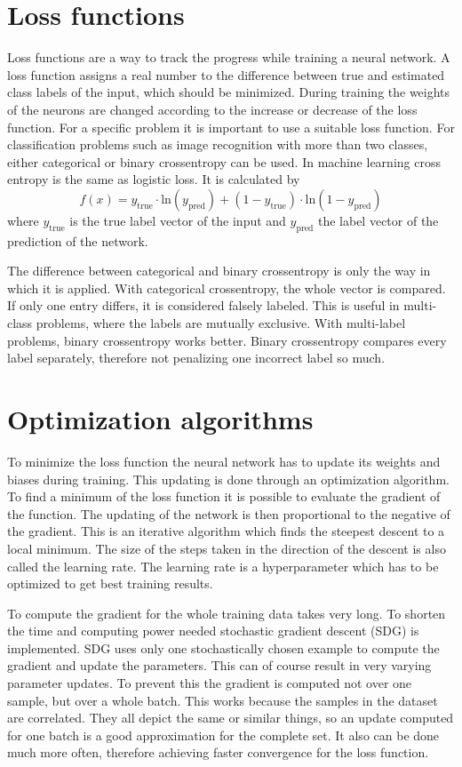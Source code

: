 \section{Loss functions}
Loss functions are a way to track the progress while training a neural network. A loss function assigns a real number to the difference between true and estimated class labels of the input, which should be minimized. During training the weights of the neurons are changed according to the increase or decrease of the loss function. For a specific problem it is important to use a suitable loss function. For classification problems such as image recognition with more than two classes, either categorical or binary crossentropy can be used. In machine learning cross entropy is the same as logistic loss. It is calculated by
\begin{equation}
f(x) = y_{\mathrm{true}} \cdot \mathrm{ln} (y_{\mathrm{pred}}) + (1 - y_{\mathrm{true}}) \cdot \mathrm{ln} (1 - y_{\mathrm{pred}})
\end{equation}
where $y_{\mathrm{true}}$ is the true label vector of the input and $y_{\mathrm{pred}}$ the label vector of the prediction of the network.

The difference between categorical and binary crossentropy is only the way in which it is applied. With categorical crossentropy, the whole vector is compared. If only one entry differs, it is considered falsely labeled. This is useful in multi-class problems, where the labels are mutually exclusive. With multi-label problems, binary crossentropy works better. Binary crossentropy compares every label separately, therefore not penalizing one incorrect label so much. 

\section{Optimization algorithms}
To minimize the loss function the neural network has to update its weights and biases during training. This updating is done through an optimization algorithm. To find a minimum of the loss function it is possible to evaluate the gradient of the function. The updating of the network is then proportional to the negative of the gradient. This is an iterative algorithm which finds the steepest descent to a local minimum. The size of the steps taken in the direction of the descent is also called the learning rate. The learning rate is a hyperparameter which has to be optimized to get best training results. 

To compute the gradient for the whole training data takes very long. To shorten the time and computing power needed stochastic gradient descent (SDG) is implemented. SDG uses only one stochastically chosen example to compute the gradient and update the parameters. This can of course result in very varying parameter updates. To prevent this the gradient is computed not over one sample, but over a whole batch. This works because the samples in the dataset are correlated. They all depict the same or similar things, so an update computed for one batch is a good approximation for the complete set. It also can be done much more often, therefore achieving faster convergence for the loss function.

